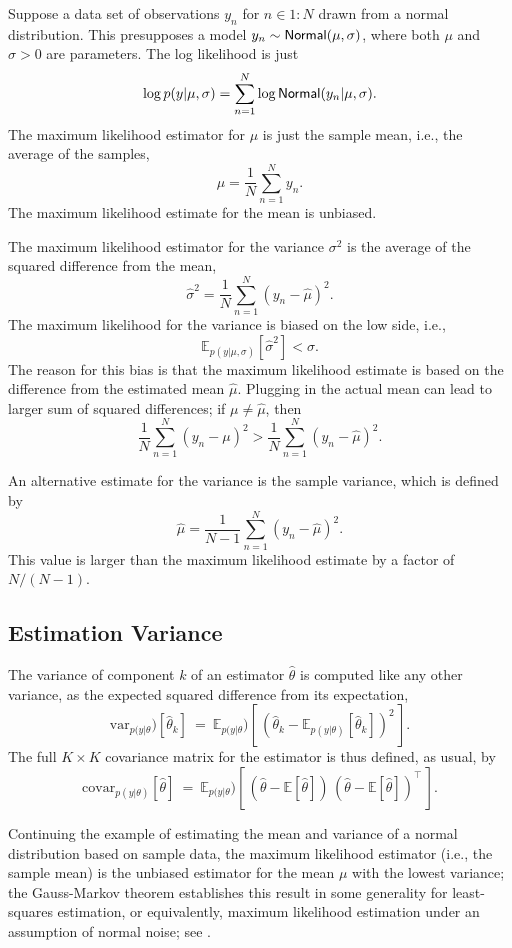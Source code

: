 Suppose a data set of observations $y_n$ for $n \in 1{:}N$ drawn from
a normal distribution.  This presupposes a model $y_n \sim
\distro{Normal}(\mu,\sigma)$, where both $\mu$ and $\sigma > 0$ are
parameters.  The log likelihood is just
\[
\log p(y|\mu,\sigma) = \sum_{n=1}^N \log
\distro{Normal}(y_n|\mu,\sigma).
\]
The maximum likelihood estimator for $\mu$ is just the sample mean,
i.e., the average of the samples,
\[
\hat{\mu} = \frac{1}{N} \sum_{n=1}^N y_n.
\]
The maximum likelihood estimate for the mean is unbiased.

The maximum likelihood estimator for the variance $\sigma^2$ is the
average of the squared difference from the mean,
\[
\hat{\sigma}^2 = \frac{1}{N} \sum_{n=1}^N (y_n - \hat{\mu})^2.
\]
The maximum likelihood for the variance is biased on the low side,
i.e.,
%
\[
\mathbb{E}_{p(y|\mu,\sigma)}[\hat{\sigma}^2] < \sigma.
\]
%
The reason for this bias is that the maximum likelihood estimate is
based on the difference from the estimated mean $\hat{\mu}$.  Plugging
in the actual mean can lead to larger sum of squared differences;  if
$\mu \neq \hat{\mu}$, then
\[
\frac{1}{N} \sum_{n=1}^N (y_n - \mu)^2
>
\frac{1}{N} \sum_{n=1}^N (y_n - \hat{\mu})^2.
\]

An alternative estimate for the variance is the sample variance, which
is defined by
\[
\hat{\mu} = \frac{1}{N-1} \sum_{n=1}^N (y_n - \hat{\mu})^2.
\]
This value is larger than the maximum likelihood estimate by a factor
of $N/(N-1)$.


\subsection{Estimation Variance}

The variance of component $k$ of an estimator $\hat{\theta}$ is
computed like any other variance, as the expected squared difference
from its expectation,
%
\[
\mbox{var}_{p(y|\theta})[\hat{\theta}_k]
\ = \
\mathbb{E}_{p(y|\theta})[\, (\hat{\theta}_k -
\mathbb{E}_{p(y|\theta)}[\hat{\theta}_k])^2 \,].
\]
%
The full $K \times K$ covariance matrix for the estimator is thus
defined, as usual, by
%
\[
\mbox{covar}_{p(y|\theta)}[\hat{\theta}]
\ = \
\mathbb{E}_{p(y|\theta})[\, (\hat{\theta} - \mathbb{E}[\hat{\theta}]) \,
                         (\hat{\theta} -
                         \mathbb{E}[\hat{\theta}])^{\top} \, ].
\]

Continuing the example of estimating the mean and variance of a normal
distribution based on sample data, the maximum likelihood estimator
(i.e., the sample mean) is the unbiased estimator for the mean $\mu$
with the lowest variance; the Gauss-Markov theorem establishes this
result in some generality for least-squares estimation, or
equivalently, maximum likelihood estimation under an assumption of
normal noise; see \citep[Section~3.2.2]{HastieTibshiraniFriedman:2009}.











